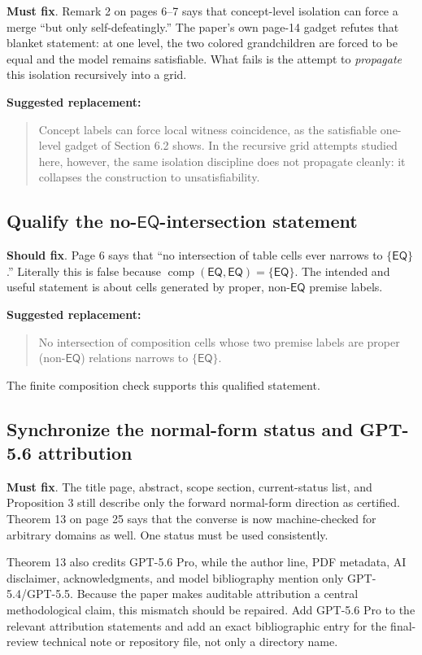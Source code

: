 \documentclass[11pt]{article}
\newcommand{\EQ}{\ensuremath{\mathsf{EQ}}}
\newcommand{\mustfix}{\textcolor{reviewred}{\textbf{Must fix}}}
\newcommand{\shouldfix}{\textcolor{reviewamber}{\textbf{Should fix}}}
\begin{document}
\mustfix. Remark 2 on pages 6--7 says that concept-level isolation can force a merge ``but only self-defeatingly.'' The paper's own page-14 gadget refutes that blanket statement: at one level, the two colored grandchildren are forced to be equal and the model remains satisfiable. What fails is the attempt to \emph{propagate} this isolation recursively into a grid.

\textbf{Suggested replacement:}
\begin{quote}
Concept labels can force local witness coincidence, as the satisfiable one-level gadget of Section 6.2 shows. In the recursive grid attempts studied here, however, the same isolation discipline does not propagate cleanly: it collapses the construction to unsatisfiability.
\end{quote}

\subsection{Qualify the no-\(\EQ\)-intersection statement}

\shouldfix. Page 6 says that ``no intersection of table cells ever narrows to \(\{\EQ\}\).'' Literally this is false because \(\operatorname{comp}(\EQ,\EQ)=\{\EQ\}\). The intended and useful statement is about cells generated by proper, non-\(\EQ\) premise labels.

\textbf{Suggested replacement:}
\begin{quote}
No intersection of composition cells whose two premise labels are proper (non-\(\EQ\)) relations narrows to \(\{\EQ\}\).
\end{quote}
The finite composition check supports this qualified statement.

\subsection{Synchronize the normal-form status and GPT-5.6 attribution}

\mustfix. The title page, abstract, scope section, current-status list, and Proposition 3 still describe only the forward normal-form direction as certified. Theorem 13 on page 25 says that the converse is now machine-checked for arbitrary domains as well. One status must be used consistently.

Theorem 13 also credits GPT-5.6 Pro, while the author line, PDF metadata, AI disclaimer, acknowledgments, and model bibliography mention only GPT-5.4/GPT-5.5. Because the paper makes auditable attribution a central methodological claim, this mismatch should be repaired. Add GPT-5.6 Pro to the relevant attribution statements and add an exact bibliographic entry for the final-review technical note or repository file, not only a directory name.
\end{document}
